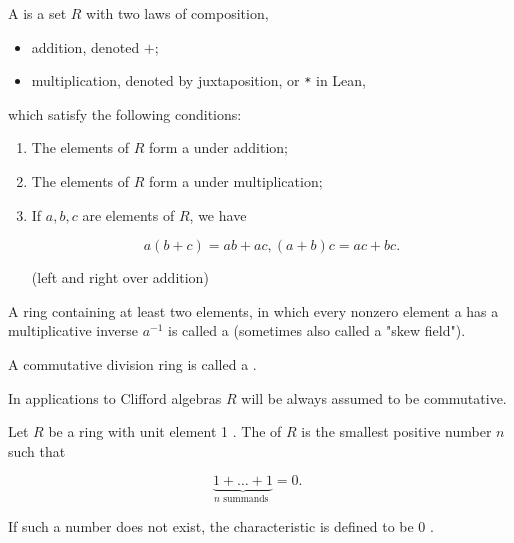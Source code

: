 \begin{definition}[Ring]
    \label{ring}
    \leanok

    A  is a set $R$ with two laws of composition, 
    
    \begin{itemize}
        
    \item addition, denoted $+$;
    \item multiplication, denoted by juxtaposition, or \texttt{*} in Lean,
    
    \end{itemize}
    
    which satisfy the following conditions:

    \begin{enumerate}
    \item The elements of $R$ form a  under addition;

    \item The elements of $R$ form a  under multiplication;

    \item If $a, b, c$ are elements of $R$, we have

    $$
    a (b + c) = a b + a c, (a + b) c = a c + b c.
    $$

    (left and right  over addition)

    \end{enumerate}



\end{definition}

\begin{remark}
    \label{mk:ring}
    
    A ring containing at least two elements, in which every nonzero element a has a multiplicative inverse $a^{-1}$ is called a  (sometimes also called a "skew field").
    
    A commutative division ring is called a .

    In applications to Clifford algebras $R$ will be always assumed to be commutative.
    
\end{remark}

\begin{definition}[Characteristic]
    \label{characteristic}
    \leanok

    Let $R$ be a ring with unit element 1 . The  of $R$ is the smallest positive number $n$ such that

    $$
    \underbrace{1+\ldots+1}_{n \text { summands }}=0 \text {. }
    $$
    
    If such a number does not exist, the characteristic is defined to be 0 .

\end{definition}

